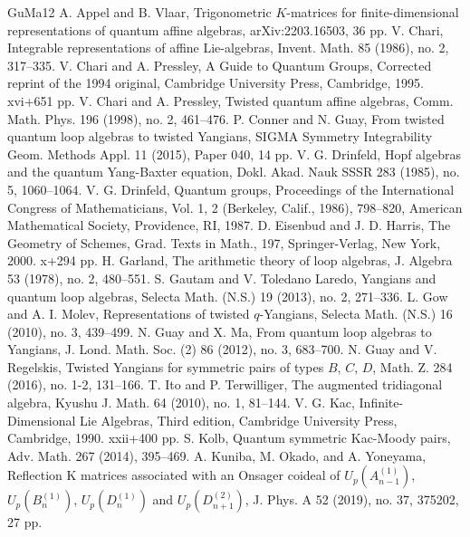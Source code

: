 \documentclass[12pt,a4paper]{amsart}
\theoremstyle{definition}
\numberwithin{equation}{subsection}
\begin{document}
\begin{thebibliography}{GuMa12}
   A. Appel and B. Vlaar, Trigonometric $K$-matrices for finite-dimensional representations of quantum affine algebras, arXiv:2203.16503, 36 pp.
   V. Chari, Integrable representations of affine Lie-algebras, Invent. Math. 85 (1986), no. 2, 317--335.
   V. Chari and A. Pressley, A Guide to Quantum Groups, Corrected reprint of the 1994 original, Cambridge University Press, Cambridge, 1995. xvi+651 pp.
   V. Chari and A. Pressley, Twisted quantum affine algebras, Comm. Math. Phys. 196 (1998), no. 2, 461--476.
   P. Conner and N. Guay, From twisted quantum loop algebras to twisted Yangians, SIGMA Symmetry Integrability Geom. Methods Appl. 11 (2015), Paper 040, 14 pp.
   V. G. Drinfeld, Hopf algebras and the quantum Yang-Baxter equation, Dokl. Akad. Nauk SSSR 283 (1985), no. 5, 1060--1064.
   V. G. Drinfeld, Quantum groups, Proceedings of the International Congress of Mathematicians, Vol. 1, 2 (Berkeley, Calif., 1986), 798--820, American Mathematical Society, Providence, RI, 1987.
   D. Eisenbud and J. D. Harris, The Geometry of Schemes, Grad. Texts in Math., 197, Springer-Verlag, New York, 2000. x+294 pp.
   H. Garland, The arithmetic theory of loop algebras, J. Algebra 53 (1978), no. 2, 480--551.
   S. Gautam and V. Toledano Laredo, Yangians and quantum loop algebras, Selecta Math. (N.S.) 19 (2013), no. 2, 271--336.
   L. Gow and A. I. Molev, Representations of twisted $q$-Yangians, Selecta Math. (N.S.) 16 (2010), no. 3, 439--499.
   N. Guay and X. Ma, From quantum loop algebras to Yangians, J. Lond. Math. Soc. (2) 86 (2012), no. 3, 683--700.
   N. Guay and V. Regelskis, Twisted Yangians for symmetric pairs of types $B$, $C$, $D$, Math. Z. 284 (2016), no. 1-2, 131--166.
   T. Ito and P. Terwilliger, The augmented tridiagonal algebra, Kyushu J. Math. 64 (2010), no. 1, 81--144.
   V. G. Kac, Infinite-Dimensional Lie Algebras, Third edition, Cambridge University Press, Cambridge, 1990. xxii+400 pp.
   S. Kolb, Quantum symmetric Kac-Moody pairs, Adv. Math. 267 (2014), 395--469.
   A. Kuniba, M. Okado, and A. Yoneyama, Reflection K matrices associated with an Onsager coideal of $U_p(A_{n-1}^{(1)})$, $U_p(B_n^{(1)})$, $U_p(D_n^{(1)})$ and $U_p(D_{n+1}^{(2)})$, J. Phys. A 52 (2019), no. 37, 375202, 27 pp.

\end{thebibliography}
\end{document}

